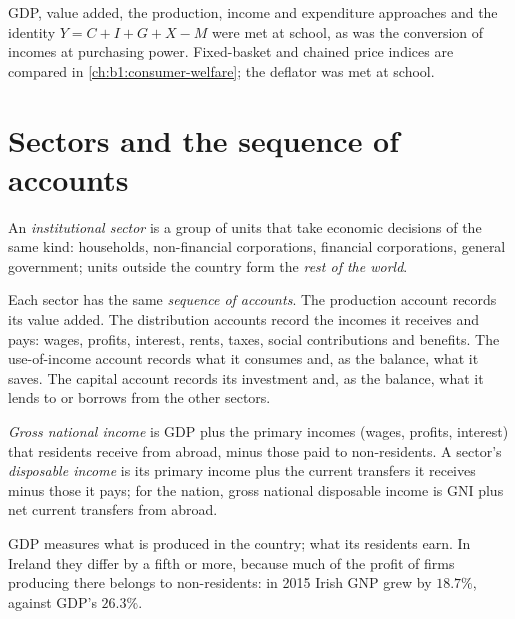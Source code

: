 \begin{recall}
GDP, value added, the production, income and expenditure approaches and
the identity $Y = C + I + G + X - M$ were met at school, as was the
conversion of incomes at purchasing power. Fixed-basket and chained price
indices are compared in \cref{ch:b1:consumer-welfare}; the deflator was met at school.
\end{recall}

\section{Sectors and the sequence of accounts}\label{sec:b1:national-accounts-in-depth:sectors}

\begin{definition}\label{def:b1:national-accounts-in-depth:sector}
An \emph{institutional sector} is a group of units that take economic
decisions of the same kind: households, non-financial corporations,
financial corporations, general government; units outside the country
form the \emph{rest of the world}.
\end{definition}

Each sector has the same \emph{sequence of accounts}. The production account
records its value added. The distribution accounts record the incomes it
receives and pays: wages, profits, interest, rents, taxes, social
contributions and benefits. The use-of-income account records what it
consumes and, as the balance, what it saves. The capital account records
its investment and, as the balance, what it lends to or borrows from the
other sectors.

\begin{definition}\label{def:b1:national-accounts-in-depth:gni}
\emph{Gross national income} is GDP plus the primary incomes (wages,
profits, interest) that residents receive from abroad, minus those paid to
non-residents. A sector's \emph{disposable income} is its primary income
plus the current transfers it receives minus those it pays; for the nation,
gross national disposable income is GNI plus net current transfers from
abroad.
\end{definition}

GDP measures what is produced in the country;  what its residents earn.
In Ireland they differ by a fifth or more, because much of the profit of
firms producing there belongs to non-residents: in 2015 Irish GNP grew by
$18.7\%$, against GDP's $26.3\%$. %

